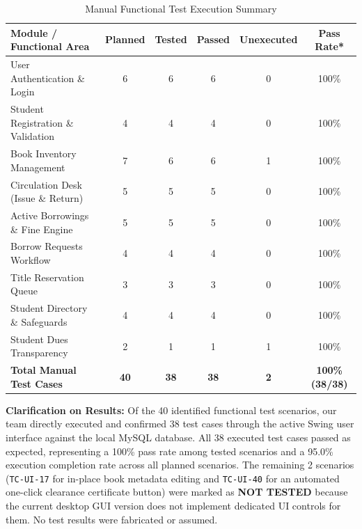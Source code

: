 \begin{table}[h!]
    \centering
    \small
    \caption{Manual Functional Test Execution Summary}
    \begin{tabularx}{\textwidth}{Xccccc}
        \toprule
        \textbf{Module / Functional Area} & \textbf{Planned} & \textbf{Tested} & \textbf{Passed} & \textbf{Unexecuted} & \textbf{Pass Rate*} \\
        \midrule
        User Authentication \& Login & 6 & 6 & 6 & 0 & 100\% \\
        Student Registration \& Validation & 4 & 4 & 4 & 0 & 100\% \\
        Book Inventory Management & 7 & 6 & 6 & 1 & 100\% \\
        Circulation Desk (Issue \& Return) & 5 & 5 & 5 & 0 & 100\% \\
        Active Borrowings \& Fine Engine & 5 & 5 & 5 & 0 & 100\% \\
        Borrow Requests Workflow & 4 & 4 & 4 & 0 & 100\% \\
        Title Reservation Queue & 3 & 3 & 3 & 0 & 100\% \\
        Student Directory \& Safeguards & 4 & 4 & 4 & 0 & 100\% \\
        Student Dues Transparency & 2 & 1 & 1 & 1 & 100\% \\
        \midrule
        \textbf{Total Manual Test Cases} & \textbf{40} & \textbf{38} & \textbf{38} & \textbf{2} & \textbf{100\% (38/38)} \\
        \bottomrule
    \end{tabularx}
    \vspace{2pt}
    \label{tab:manual_summary}
\end{table}

\noindent \textbf{Clarification on Results:} Of the 40 identified functional test scenarios, our team directly executed and confirmed 38 test cases through the active Swing user interface against the local MySQL database. All 38 executed test cases passed as expected, representing a 100\% pass rate among tested scenarios and a 95.0\% execution completion rate across all planned scenarios. The remaining 2 scenarios (\texttt{TC-UI-17} for in-place book metadata editing and \texttt{TC-UI-40} for an automated one-click clearance certificate button) were marked as \textbf{NOT TESTED} because the current desktop GUI version does not implement dedicated UI controls for them. No test results were fabricated or assumed.

